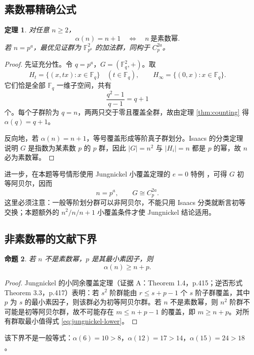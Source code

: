 \documentclass[11pt,a4paper]{article}
\numberwithin{equation}{section}
\theoremstyle{plain}
\newtheorem{theorem}{定理}[section]
\newtheorem{proposition}[theorem]{命题}
\theoremstyle{definition}
\theoremstyle{remark}
\newcommand{\F}{\mathbb{F}}
\begin{document}
\subsection{素数幂精确公式}
\begin{theorem}\label{thm:primepower}
对任意 $n\ge2$，
\begin{equation}\label{eq:primepower-iff}
 \alpha(n)=n+1\quad\Longleftrightarrow\quad n\ \text{是素数幂}.
\end{equation}
若 $n=p^a$，最优见证群为 $\F_{p^a}^2$ 的加法群，同构于 $C_p^{2a}$。
\end{theorem}
\begin{proof}
先证充分性。令 $q=p^a$，$G=(\F_q^2,+)$。取
\begin{equation}
 H_t=\{(x,tx):x\in\F_q\}\quad(t\in\F_q),
 \qquad H_\infty=\{(0,x):x\in\F_q\}.
\end{equation}
它们恰是全部 $\F_q$ 一维子空间，共有
\begin{equation}
 \frac{q^2-1}{q-1}=q+1
\end{equation}
个。每个子群阶为 $q=n$，两两只交于零且覆盖全群，故由定理 \ref{thm:counting} 得 $\alpha(q)=q+1$。

反向地，若 $\alpha(n)=n+1$，等号覆盖形成等阶真子群划分。Isaacs 的分类定理 \cite{Isaacs1973} 说明 $G$ 是指数为某素数 $p$ 的 $p$ 群，因此 $|G|=n^2$ 与 $|H_i|=n$ 都是 $p$ 的幂，故 $n$ 必为素数幂。
\end{proof}

进一步，在本题等号情形使用 Jungnickel 小覆盖定理的 $e=0$ 特例 \cite{Jungnickel1999}，可得 $G$ 初等阿贝尔，因而
\begin{equation}
 n=p^a,\qquad G\cong C_p^{2a}.
\end{equation}
这里必须注意：一般等阶划分群可以非阿贝尔，不能只用 Isaacs 分类就断言初等交换；本题额外的 $n^2/n/n+1$ 小覆盖条件才使 Jungnickel 结论适用。

\subsection{非素数幂的文献下界}
\begin{proposition}\label{prop:jungnickel-lower}
若 $n$ 不是素数幂，$p$ 是其最小素因子，则
\begin{equation}\label{eq:jungnickel-lower}
 \alpha(n)\ge n+p.
\end{equation}
\end{proposition}
\begin{proof}
Jungnickel 的小同余覆盖定理（证据 A：Theorem 1.4，p.415；逆否形式 Theorem 3.3，p.417）表明：若 $s^2$ 阶群能由 $r\le s+p-1$ 个 $s$ 阶子群覆盖，其中 $p$ 为 $s$ 的最小素因子，则该群必为初等阿贝尔群。若 $n$ 不是素数幂，则 $n^2$ 阶群不可能是初等阿贝尔群，故不可能存在 $m\le n+p-1$ 的覆盖，即 $m\ge n+p$。对所有群取最小值得式 \eqref{eq:jungnickel-lower}。
\end{proof}
该下界不是一般等式：$\alpha(6)=10>8$，$\alpha(12)=17>14$，$\alpha(15)=24>18$。
\end{document}
